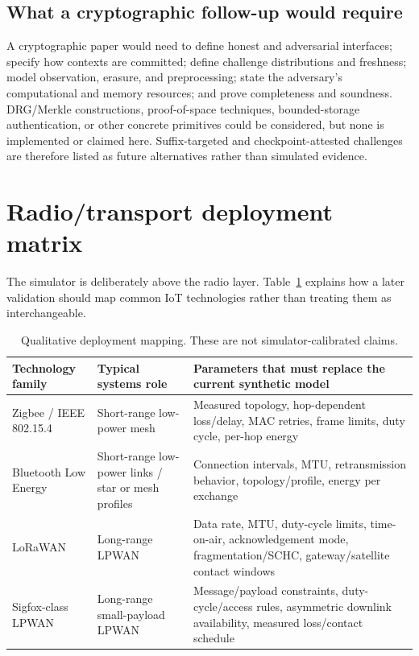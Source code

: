 \documentclass[11pt]{article}
\begin{document}
\subsection{What a cryptographic follow-up would require}
A cryptographic paper would need to define honest and adversarial interfaces; specify how contexts are committed; define challenge distributions and freshness; model observation, erasure, and preprocessing; state the adversary's computational and memory resources; and prove completeness and soundness. DRG/Merkle constructions, proof-of-space techniques, bounded-storage authentication, or other concrete primitives could be considered, but none is implemented or claimed here. Suffix-targeted and checkpoint-attested challenges are therefore listed as future alternatives rather than simulated evidence.

\section{Radio/transport deployment matrix}
The simulator is deliberately above the radio layer. Table~\ref{tab:radio} explains how a later validation should map common IoT technologies rather than treating them as interchangeable.

\begin{table}[H]
\centering
\caption{Qualitative deployment mapping. These are not simulator-calibrated claims.}
\label{tab:radio}
\small
\begin{tabular}{p{2.1cm}p{3cm}p{6.4cm}}
\toprule
Technology family & Typical systems role & Parameters that must replace the current synthetic model\\
\midrule
Zigbee / IEEE 802.15.4 & Short-range low-power mesh & Measured topology, hop-dependent loss/delay, MAC retries, frame limits, duty cycle, per-hop energy\\
Bluetooth Low Energy & Short-range low-power links / star or mesh profiles & Connection intervals, MTU, retransmission behavior, topology/profile, energy per exchange\\
LoRaWAN & Long-range LPWAN & Data rate, MTU, duty-cycle limits, time-on-air, acknowledgement mode, fragmentation/SCHC, gateway/satellite contact windows\\
Sigfox-class LPWAN & Long-range small-payload LPWAN & Message/payload constraints, duty-cycle/access rules, asymmetric downlink availability, measured loss/contact schedule\\
\bottomrule
\end{tabular}
\end{table}
\end{document}
